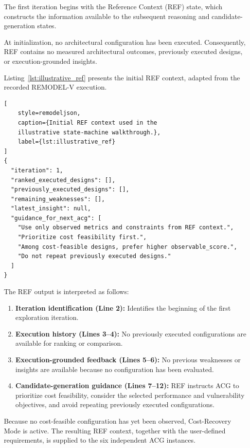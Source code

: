 The first iteration begins with the Reference
Context (REF) state, which constructs the
information available to the subsequent
reasoning and candidate-generation states.

At initialization, no architectural
configuration has been executed. Consequently,
REF contains no measured architectural
outcomes, previously executed designs, or
execution-grounded insights.

Listing~\ref{lst:illustrative_ref}
presents the initial REF context, adapted
from the recorded REMODEL-V execution.

\begin{lstlisting}[
    style=remodeljson,
    caption={Initial REF context used in the
    illustrative state-machine walkthrough.},
    label={lst:illustrative_ref}
]
{
  "iteration": 1,
  "ranked_executed_designs": [],
  "previously_executed_designs": [],
  "remaining_weaknesses": [],
  "latest_insight": null,
  "guidance_for_next_acg": [
    "Use only observed metrics and constraints from REF context.",
    "Prioritize cost feasibility first.",
    "Among cost-feasible designs, prefer higher observable_score.",
    "Do not repeat previously executed designs."
  ]
}
\end{lstlisting}

The REF output is interpreted as follows:

\begin{enumerate}

\item \textbf{Iteration identification (Line 2):}
Identifies the beginning of the first
exploration iteration.

\item \textbf{Execution history (Lines 3--4):}
No previously executed configurations
are available for ranking or comparison.

\item \textbf{Execution-grounded feedback
(Lines 5--6):}
No previous weaknesses or insights
are available because no configuration
has been evaluated.

\item \textbf{Candidate-generation guidance
(Lines 7--12):}
REF instructs ACG to prioritize cost
feasibility, consider the selected
performance and vulnerability objectives,
and avoid repeating previously executed
configurations.

\end{enumerate}

Because no cost-feasible configuration
has yet been observed, Cost-Recovery Mode
is active. The resulting REF context,
together with the user-defined requirements,
is supplied to the six independent ACG
instances.


